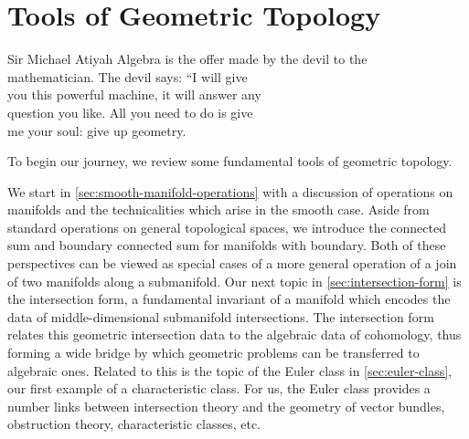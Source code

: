 \chapter{Tools of Geometric Topology}\label{chap:fundamentals}

%
%

\begin{epigraph}{20em}{Sir Michael Atiyah}
	Algebra is the offer made by the devil to the \\
	mathematician. The devil says: ``I will give \\
	you this powerful machine, it will answer any \\
	question you like. All you need to do is give\\
	me your soul: give up geometry.
\end{epigraph}

\noindent
To begin our journey, we review some fundamental tools of geometric topology.

We start in \cref{sec:smooth-manifold-operations} with a discussion of operations on manifolds and the technicalities which arise in the smooth case. Aside from standard operations on general topological spaces, we introduce the connected sum and boundary connected sum for manifolds with boundary. Both of these perspectives can be viewed as special cases of a more general operation of a join of two manifolds along a submanifold. Our next topic in \cref{sec:intersection-form} is the intersection form, a fundamental invariant of a manifold which encodes the data of middle-dimensional submanifold intersections. The intersection form relates this geometric intersection data to the algebraic data of cohomology, thus forming a wide bridge by which geometric problems can be transferred to algebraic ones. Related to this is the topic of the Euler class in \cref{sec:euler-class}, our first example of a characteristic class. For us, the Euler class provides a number links between intersection theory and the geometry of vector bundles, obstruction theory, characteristic classes, etc.

